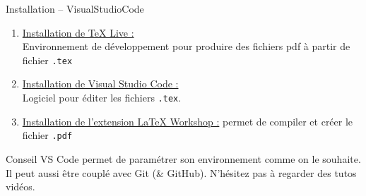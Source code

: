 \begin{frame}{Installation -- VisualStudioCode}
    \begin{enumerate}
        \item \underline{Installation de TeX Live :}  \\
        Environnement de développement pour produire des fichiers pdf à partir de fichier \texttt{.tex}
        \item \underline{Installation de Visual Studio Code :}  \\
        Logiciel pour éditer les fichiers \texttt{.tex}.
        \item \underline{Installation de l'extension LaTeX Workshop :} permet de compiler et créer le fichier \texttt{.pdf}
    \end{enumerate}
    \begin{exampleblock}{Conseil}
        VS Code permet de paramétrer son environnement comme on le souhaite.
        Il peut aussi être couplé avec Git (\& GitHub).
        N'hésitez pas à regarder des tutos vidéos.
    \end{exampleblock}
\end{frame}